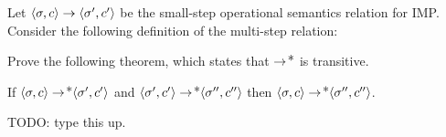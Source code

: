 \documentclass[11pt]{article}
\begin{document}
\begin{exercise}
Let $\CONFIG{\sigma}{c} \stepsone \CONFIG{\sigma'}{c'}$ be the
small-step operational semantics relation for IMP. Consider the
following definition of the multi-step relation:

\begin{mathpar}

\end{mathpar}

\noindent Prove the following theorem, which states that
$\stepsone\kleenestar$ is transitive.

\begin{theorem*} If \( \CONFIG{\sigma}{c} \stepsone\kleenestar
\CONFIG{\sigma'}{c'} \) and \( \CONFIG{\sigma'}{c'}
\stepsone\kleenestar \CONFIG{\sigma''}{c''} \) then \(
\CONFIG{\sigma}{c} \stepsone\kleenestar \CONFIG{\sigma''}{c''} \).
\end{theorem*}

TODO: type this up.
\end{exercise}
\end{document}

